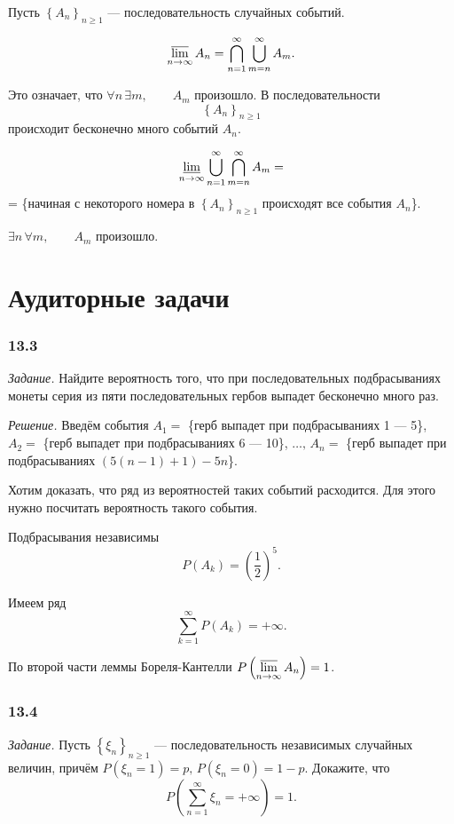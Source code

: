 Пусть $ \left\{ A_n \right\}_{n \geq 1}$ --- последовательность случайных событий.

$$ \varlimsup \limits_{n \to \infty } A_n =
\bigcap \limits_{n=1}^{ \infty } \bigcup \limits_{m=n}^{ \infty } A_m.$$

Это означает, что $ \forall n \, \exists m, \qquad A_m$ произошло.
В последовательности
$$ \left\{ A_n \right\}_{n \geq 1}$$
происходит бесконечно много событий $A_n$.

$$ \varliminf \limits_{n \to \infty } \bigcup \limits_{n=1}^{ \infty } \bigcap \limits_{m=n}^{ \infty } A_m =$$
= \{начиная с некоторого номера в $ \left\{ A_n \right\}_{n \geq 1}$ происходят все события $A_n$\}.

$ \exists n \, \forall m, \qquad A_m$ произошло.

\section*{Аудиторные задачи}

\subsubsection*{13.3}

\textit{Задание.} Найдите вероятность того, что при последовательных подбрасываниях монеты серия из пяти последовательных гербов выпадет бесконечно много раз.

\textit{Решение.}
Введём события $A_1 =$ \{герб выпадет при подбрасываниях 1 --- 5\}, $A_2 =$ \{герб выпадет при подбрасываниях 6 --- 10\},
$\dotsc, \, A_n =$ \{герб выпадет при подбрасываниях $\left( 5 \left( n-1 \right) + 1 \right) - 5n$\}.

Хотим доказать, что ряд из вероятностей таких событий расходится.
Для этого нужно посчитать вероятность такого события.

Подбрасывания независимы
$$P \left( A_k \right) =
\left( \frac{1}{2} \right)^5.$$

Имеем ряд
$$ \sum \limits_{k=1}^{ \infty } P \left( A_k \right) =
+ \infty.$$

По второй части леммы Бореля-Кантелли $P \left( \varlimsup \limits_{n \to \infty } A_n \right) = 1$.

\subsubsection*{13.4}

\textit{Задание.}
Пусть $ \left\{ \xi_n \right\}_{n \geq 1}$ --- последовательность независимых случайных величин,
причём $P \left( \xi_n = 1 \right) = p, \, P \left( \xi_n = 0 \right) = 1 - p$.
Докажите, что
$$P \left( \sum \limits_{n=1}^{ \infty } \xi_n = + \infty \right) = 1.$$

